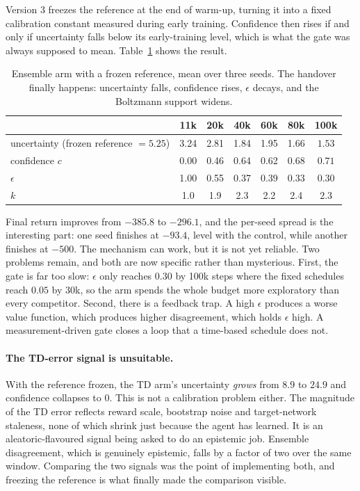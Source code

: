 \documentclass[11pt,a4paper]{article}
\begin{document}
Version 3 freezes the reference at the end of warm-up, turning it into a fixed
calibration constant measured during early training. Confidence then rises if
and only if uncertainty falls below its early-training level, which is what the
gate was always supposed to mean. Table~\ref{tab:frozen} shows the result.

\begin{table}[h]
\centering
\small
\caption{Ensemble arm with a frozen reference, mean over three seeds. The
handover finally happens: uncertainty falls, confidence rises, $\epsilon$
decays, and the Boltzmann support widens.}
\label{tab:frozen}
\begin{tabular}{lcccccc}
\toprule
& 11k & 20k & 40k & 60k & 80k & 100k \\
\midrule
uncertainty (frozen reference $= 5.25$) & 3.24 & 2.81 & 1.84 & 1.95 & 1.66 & $\mathbf{1.53}$ \\
confidence $c$ & 0.00 & 0.46 & 0.64 & 0.62 & 0.68 & $\mathbf{0.71}$ \\
$\epsilon$ & 1.00 & 0.55 & 0.37 & 0.39 & 0.33 & $\mathbf{0.30}$ \\
$k$ & 1.0 & 1.9 & 2.3 & 2.2 & 2.4 & $\mathbf{2.3}$ \\
\bottomrule
\end{tabular}
\end{table}

Final return improves from $-385.8$ to $-296.1$, and the per-seed spread is the
interesting part: one seed finishes at $-93.4$, level with the control, while
another finishes at $-500$. The mechanism can work, but it is not yet reliable.
Two problems remain, and both are now specific rather than mysterious. First,
the gate is far too slow: $\epsilon$ only reaches $0.30$ by 100k steps where
the fixed schedules reach $0.05$ by 30k, so the arm spends the whole budget
more exploratory than every competitor. Second, there is a feedback trap. A
high $\epsilon$ produces a worse value function, which produces higher
disagreement, which holds $\epsilon$ high. A measurement-driven gate closes a
loop that a time-based schedule does not.

\paragraph{The TD-error signal is unsuitable.}
With the reference frozen, the TD arm's uncertainty \emph{grows} from $8.9$ to
$24.9$ and confidence collapses to $0$. This is not a calibration problem
either. The magnitude of the TD error reflects reward scale, bootstrap noise
and target-network staleness, none of which shrink just because the agent has
learned. It is an aleatoric-flavoured signal being asked to do an epistemic
job. Ensemble disagreement, which is genuinely epistemic, falls by a factor of
two over the same window. Comparing the two signals was the point of
implementing both, and freezing the reference is what finally made the
comparison visible.
\end{document}
